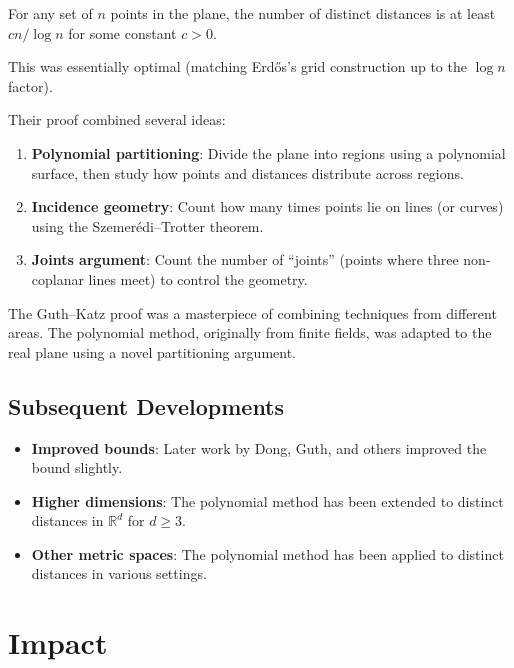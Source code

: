 \begin{theorem}
For any set of $n$ points in the plane, the number of distinct distances is at least $cn/\log n$ for some constant $c > 0$.
\end{theorem}

This was essentially optimal (matching Erd\H{o}s's grid construction up to the $\log n$ factor).

Their proof combined several ideas:

\begin{enumerate}
\item \textbf{Polynomial partitioning}: Divide the plane into regions using a polynomial surface, then study how points and distances distribute across regions.
\item \textbf{Incidence geometry}: Count how many times points lie on lines (or curves) using the Szemer\'edi--Trotter theorem.
\item \textbf{Joints argument}: Count the number of ``joints'' (points where three non-coplanar lines meet) to control the geometry.
\end{enumerate}

\begin{highlightbox}
The Guth--Katz proof was a masterpiece of combining techniques from different areas. The polynomial method, originally from finite fields, was adapted to the real plane using a novel partitioning argument.
\end{highlightbox}

\subsection{Subsequent Developments}

\begin{itemize}
\item \textbf{Improved bounds}: Later work by Dong, Guth, and others improved the bound slightly.
\item \textbf{Higher dimensions}: The polynomial method has been extended to distinct distances in $\mathbb{R}^d$ for $d \geq 3$.
\item \textbf{Other metric spaces}: The polynomial method has been applied to distinct distances in various settings.
\end{itemize}

\section{Impact}

